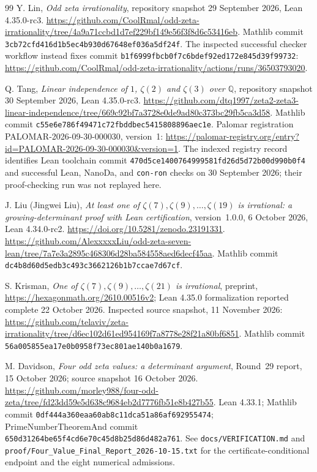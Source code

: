 \documentclass[11pt,letterpaper]{article}
\theoremstyle{definition}
\newcommand{\Q}{\mathbb Q}
\begin{document}
\begin{thebibliography}{99}
Y. Lin, \emph{Odd zeta irrationality}, repository snapshot
29 September 2026, Lean 4.35.0-rc3.
\url{https://github.com/CoolRmal/odd-zeta-irrationality/tree/4a9a71ccbd1d7ef229bf149e56f3f8d6c53416eb}.
Mathlib commit \texttt{3cb72cfd416d1b5ec4b930d67648ef036a5df24f}.
The inspected successful checker workflow instead fixes commit
\texttt{b1f6999fbcb0f7c6bdef92ed172e845d39f99732}:
\url{https://github.com/CoolRmal/odd-zeta-irrationality/actions/runs/36503793020}.

Q. Tang, \emph{Linear independence of $1$, $\zeta(2)$ and $\zeta(3)$
over $\Q$}, repository snapshot 30 September 2026, Lean 4.35.0-rc3.
\url{https://github.com/dtq1997/zeta2-zeta3-linear-independence/tree/669c92bf7a3728e0de9ad80c373bc29fb5ca3d58}.
Mathlib commit \texttt{c55e6e786f49471c72fbddbec5415808896aec1e}.
Palomar registration PALOMAR-2026-09-30-000030, version~1:
\url{https://palomar-registry.org/entry?id=PALOMAR-2026-09-30-000030&version=1}.
The indexed registry record identifies Lean toolchain commit
\texttt{470d5ce1400764999581fd26d5d72b00d990b0f4} and successful
Lean, NanoDa, and \texttt{con-ron} checks on 30 September 2026;
their proof-checking run was not replayed here.

J. Liu (Jingwei Liu), \emph{At least one of
$\zeta(7),\zeta(9),\ldots,\zeta(19)$ is irrational: a growing-determinant
proof with Lean certification}, version~1.0.0, 6 October 2026,
Lean 4.34.0-rc2. \url{https://doi.org/10.5281/zenodo.23191331}.
\url{https://github.com/AlexxxxxLiu/odd-zeta-seven-lean/tree/7a7e3a2895c468306d28ba584558aed6decf45aa}.
Mathlib commit \texttt{dc4b8d60d5edb3c493c3662126b1b7ccae7d67cf}.

S. Krisman, \emph{One of $\zeta(7),\zeta(9),\ldots,\zeta(21)$ is
irrational}, preprint, \url{https://hexagonmath.org/2610.00516v2};
Lean 4.35.0 formalization reported complete 22 October 2026.
Inspected source snapshot, 11 November 2026:
\url{https://github.com/telaviv/zeta-irrationality/tree/d6ec102d61ed954169f7a8778e28f21a80bf6851}.
Mathlib commit \texttt{56a005855ea17e0b0958f73ec801ae140b0a1679}.

M. Davidson, \emph{Four odd zeta values: a determinant argument},
Round~29 report, 15 October 2026; source snapshot 16 October 2026.
\url{https://github.com/morley988/four-odd-zeta/tree/fd23dd59e5d638c9684eb2d7776fb51e8b427b55}.
Lean 4.33.1; Mathlib commit
\texttt{0df444a360eaa60ab8c11dca51a86af692955474};
PrimeNumberTheoremAnd commit
\texttt{650d31264be65f4cd6e70c45d8b25d86d482a761}.
See \texttt{docs/VERIFICATION.md} and
\texttt{proof/Four\_Value\_Final\_Report\_2026-10-15.txt} for the
certificate-conditional endpoint and the eight numerical admissions.


\end{thebibliography}
\end{document}
